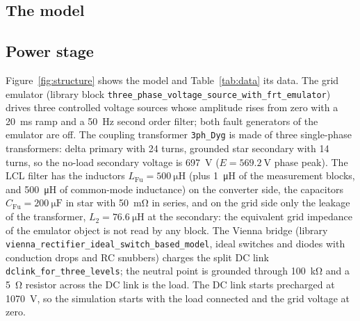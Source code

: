 \documentclass[11pt,a4paper]{scrartcl}
\newcommand{\ped}[1]{_{\mathrm{#1}}}
\newcommand{\code}[1]{\texttt{#1}}
\newcommand{\us}{\_\allowbreak}  %
\begin{document}
\begin{onehalfspace}
\section{The model}
\label{sec:model}

\subsection{Power stage}
\label{sec:power}

Figure~\ref{fig:structure} shows the model and Table~\ref{tab:data} its data. The grid emulator (library block \code{three\us phase\us voltage\us source\us with\us frt\us emulator}) drives three controlled voltage sources whose amplitude rises from zero with a \SI{20}{\milli\second} ramp and a \SI{50}{\hertz} second order filter; both fault generators of the emulator are off. The coupling transformer \code{3ph\_Dyg} is made of three single-phase transformers: delta primary with 24 turns, grounded star secondary with 14 turns, so the no-load secondary voltage is \SI{697}{\volt} ($E = \SI{569.2}{\volt}$ phase peak). The LCL filter has the inductors $L\ped{Fu} = \SI{500}{\micro\henry}$ (plus \SI{1}{\micro\henry} of the measurement blocks, and \SI{500}{\micro\henry} of common-mode inductance) on the converter side, the capacitors $C\ped{Fu} = \SI{200}{\micro\farad}$ in star with \SI{50}{\milli\ohm} in series, and on the grid side only the leakage of the transformer, $L_2 = \SI{76.6}{\micro\henry}$ at the secondary: the equivalent grid impedance of the emulator object is not read by any block. The Vienna bridge (library \code{vienna\us rectifier\us ideal\us switch\us based\us model}, ideal switches and diodes with conduction drops and RC snubbers) charges the split DC link \code{dclink\_for\_three\_levels}; the neutral point is grounded through \SI{100}{\kilo\ohm} and a \SI{5}{\ohm} resistor across the DC link is the load. The DC link starts precharged at \SI{1070}{\volt}, so the simulation starts with the load connected and the grid voltage at zero.


\end{onehalfspace}
\end{document}
